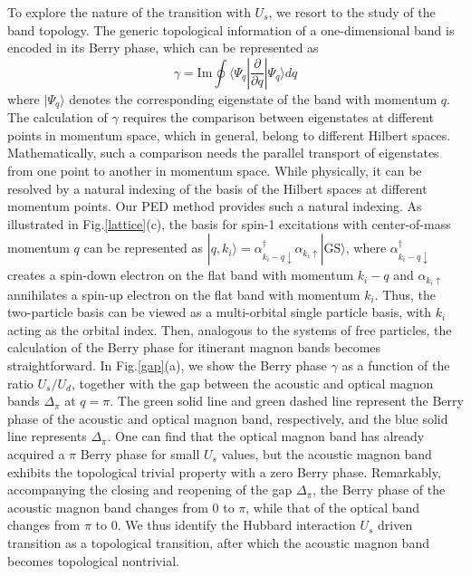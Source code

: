 \documentclass[amsmath,superscriptaddress,showpacs,aps,prb,twocolumn]{revtex4-1}
\begin{document}
\par To explore the nature of the transition with $U_s$, we resort to the study of the band topology. The generic topological information of a one-dimensional band is encoded in its Berry phase, which can be represented as
\begin{equation}
\gamma=\text{Im}\oint\langle \Psi_q|\frac{\partial}{\partial q}|\Psi_q\rangle dq
\end{equation}
where $|\Psi_q\rangle$ denotes the corresponding eigenstate of the band with momentum $q$. The calculation of $\gamma$ requires the comparison between eigenstates at different points in momentum space, which in general, belong to different Hilbert spaces. Mathematically, such a comparison needs the parallel transport of eigenstates from one point to another in momentum space. While physically, it can be resolved by a natural indexing of the basis of the Hilbert spaces at different momentum points. Our PED method provides such a natural indexing. As illustrated in Fig.\ref{lattice}(c), the basis for spin-1 excitations with center-of-mass momentum $q$ can be represented as $|q,k_i\rangle=\alpha_{k_i-q\downarrow}^\dagger\alpha_{k_i\uparrow}|\text{GS}\rangle$, where $\alpha_{k_i-q\downarrow}^\dagger$ creates a spin-down electron on the flat band with momentum $k_i-q$ and $\alpha_{k_i\uparrow}$ annihilates a spin-up electron on the flat band with momentum $k_i$. Thus, the two-particle basis can be viewed as a multi-orbital single particle basis, with $k_i$ acting as the orbital index. Then, analogous to the systems of free particles, the calculation of the Berry phase for itinerant magnon bands becomes straightforward. In Fig.\ref{gap}(a), we show the Berry phase $\gamma$ as a function of the ratio $U_s/U_d$, together with the gap between the acoustic and optical magnon bands $\Delta_\pi$ at $q=\pi$. The green solid line and green dashed line represent the Berry phase of the acoustic and optical magnon band, respectively, and the blue solid line represents $\Delta_\pi$. One can find that the optical magnon band has already acquired a $\pi$  Berry phase for small $U_s$ values, but the acoustic magnon band exhibits the topological trivial property with a zero Berry phase. Remarkably, accompanying the closing and reopening of the gap $\Delta_\pi$, the Berry phase of the acoustic magnon band changes from $0$ to $\pi$, while that of the optical band changes from $\pi$ to $0$. We thus identify the Hubbard interaction $U_s$ driven transition as a topological transition, after which the acoustic magnon band becomes topological nontrivial.
\end{document}
